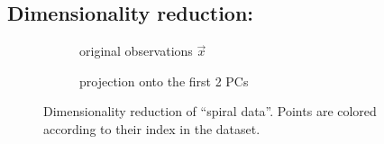 

\begin{frame}


\section{Dimensionality reduction:}


\begin{figure}[ht]
     \centering
     \begin{subfigure}[t]{0.4\textwidth}
         \centering
         \usebox{\imagebox}%
         \caption{original observations $\vec x$}
         \label{fig:spiral_data}
     \end{subfigure}
     \hfill
     \begin{subfigure}[t]{0.35\textwidth}
         \centering
         \caption{projection onto the first 2 PCs}
         \label{fig:spiral_pca}
     \end{subfigure}
     \caption{Dimensionality reduction of ``spiral data''. Points are colored according to their index in the dataset.}
	 \label{fig:spiral}
\end{figure}

\end{frame}
